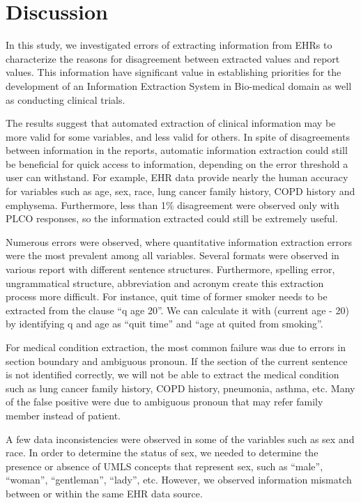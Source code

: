 \documentclass{amia}
\begin{document}
\section*{Discussion}
In this study, we investigated errors of extracting information from EHRs to characterize the reasons for disagreement between extracted values and report values. This information have significant value in establishing priorities for the development of an Information Extraction System in Bio-medical domain as well as conducting clinical trials. 

The results suggest that automated extraction of clinical information may be more valid for some variables, and less valid for others. In spite of disagreements between information in the reports, automatic information extraction could still be beneficial for quick access to information, depending on the error threshold a user can withstand. For example, EHR data provide nearly the human accuracy for variables such as age, sex, race, lung cancer family history, COPD history and emphysema. Furthermore, less than 1\% disagreement were observed only with PLCO responses, so the information extracted could still be extremely useful.

Numerous errors were observed, where quantitative information extraction errors were the most prevalent among all variables. Several formats were observed in various report with different sentence structures. Furthermore, spelling error, ungrammatical structure, abbreviation and acronym create this extraction process more difficult. For instance, quit time of former smoker needs to be extracted from the clause ``q age 20''. We can calculate it with (current age - 20) by identifying q and age as ``quit time'' and ``age at quited from smoking''.  

For medical condition extraction, the most common failure was due to errors in section boundary and ambiguous pronoun. If the section of the current sentence is not identified correctly, we will not be able to extract the medical condition such as lung cancer family history, COPD history, pneumonia, asthma, etc. Many of the false positive were due to ambiguous pronoun that may refer family member instead of patient.

A  few data inconsistencies were observed in some of the variables such as sex and race. In order to determine the status of sex, we needed to determine the presence or absence of UMLS concepts that represent sex, such as ``male'', ``woman'', ``gentleman'', ``lady'', etc. However, we observed information mismatch between or within the same EHR data source.
\end{document}
